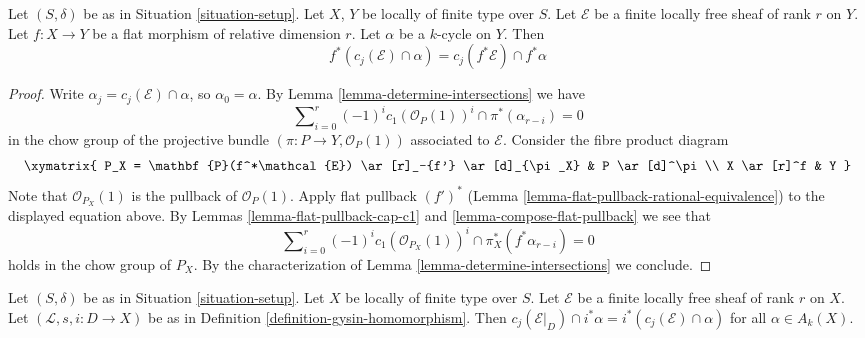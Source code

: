 \begin{lemma}
\label{lemma-flat-pullback-cap-cj}
Let $(S, \delta)$ be as in Situation \ref{situation-setup}.
Let $X$, $Y$ be locally of finite type over $S$.
Let $\mathcal{E}$ be a finite locally free sheaf of rank $r$ on $Y$.
Let $f : X \to Y$ be a flat morphism of relative dimension $r$.
Let $\alpha$ be a $k$-cycle on $Y$.
Then
$$
f^*(c_j(\mathcal{E}) \cap \alpha) = c_j(f^*\mathcal{E}) \cap f^*\alpha
$$
\end{lemma}

\begin{proof}
Write $\alpha_j = c_j(\mathcal{E}) \cap \alpha$, so $\alpha_0 = \alpha$.
By Lemma \ref{lemma-determine-intersections} we have
$$
\sum\nolimits_{i = 0}^r
(-1)^i c_1(\mathcal{O}_P(1))^i \cap
\pi^*(\alpha_{r - i}) = 0
$$
in the chow group of the projective bundle
$(\pi : P \to Y, \mathcal{O}_P(1))$
associated to $\mathcal{E}$. Consider the fibre product diagram
$$
\xymatrix{
P_X = \mathbf{P}(f^*\mathcal{E}) \ar[r]_-{f'} \ar[d]_{\pi_X} &
P \ar[d]^\pi \\
X \ar[r]^f & Y
}
$$
Note that $\mathcal{O}_{P_X}(1)$ is the pullback of $\mathcal{O}_P(1)$.
Apply flat pullback $(f')^*$
(Lemma \ref{lemma-flat-pullback-rational-equivalence}) to the displayed
equation above. By Lemmas \ref{lemma-flat-pullback-cap-c1} and
\ref{lemma-compose-flat-pullback} we see that
$$
\sum\nolimits_{i = 0}^r
(-1)^i c_1(\mathcal{O}_{P_X}(1))^i \cap
\pi_X^*(f^*\alpha_{r - i}) = 0
$$
holds in the chow group of $P_X$. By the characterization of
Lemma \ref{lemma-determine-intersections} we conclude.
\end{proof}

\begin{lemma}
\label{lemma-cap-chern-class-commutes-with-gysin}
Let $(S, \delta)$ be as in Situation \ref{situation-setup}.
Let $X$ be locally of finite type over $S$.
Let $\mathcal{E}$ be a finite locally free sheaf of rank $r$ on $X$.
Let $(\mathcal{L}, s, i : D \to X)$ be as in
Definition \ref{definition-gysin-homomorphism}.
Then $c_j(\mathcal{E}|_D) \cap i^*\alpha = i^*(c_j(\mathcal{E}) \cap \alpha)$
for all $\alpha \in A_k(X)$.
\end{lemma}

